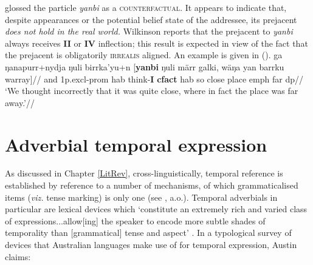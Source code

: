 \citet[686]{Wilkinson1991} glossed the particle \textit{yanbi} as a \textsc{counterfactual}. It appears to indicate that, despite appearances or the potential belief state of the addressee, its prejacent \textit{does not hold in the real world.} Wilkinson reports that the prejacent to \textit{yanbi} always receives \textbf{II} or \textbf{IV} inflection; this result is expected in view of the fact that the prejacent is obligatorily \textsc{irrealis} aligned. An example is given in (\nextx).
\pex\begingl\gla ga ŋanapurr+nydja ŋuli birrka'yu+n [\textbf{yanbi} ŋuli märr galki, wäŋa yan barrku warray]//
\glb and 1p.\gls{excl}-\gls{prom} \gls{hab} think-\textbf{I} \textbf{\gls{cfact}} \gls{hab} so close place \gls{emph} far \gls{dp}//
\glft`We thought incorrectly that it was quite close, where in fact the place was far away.'//\endgl\xe





\section{Adverbial temporal expression}

As discussed in Chapter \ref{LitRev}, cross-linguistically, temporal reference is established by reference to a number of mechanisms, of which grammaticalised items (\textit{viz.} tense marking) is only one (see \citealp{Tonhauser2015}, \citealp{Klein2009b} a.o.). Temporal adverbials in particular are lexical devices which `constitute an extremely rich and varied class of expressions...allow[ing] the speaker to encode more subtle shades of temporality than [grammatical] tense and aspect' \citep[158]{Klein1994}. In a typological survey of devices that Australian languages make use of for temporal expression, Austin claims: 



